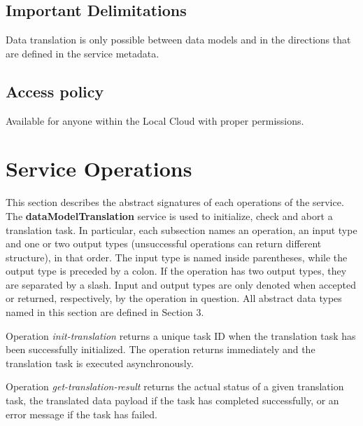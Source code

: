 \documentclass[a4paper]{arrowhead}
\begin{document}
\subsection{Important Delimitations}
\label{sec:delimitations}

Data translation is only possible between data models and in the directions that are defined in the service metadata.

\subsection{Access policy}
\label{sec:accesspolicy}

Available for anyone within the Local Cloud with proper permissions.

\newpage

\section{Service Operations}
\label{sec:functions}

This section describes the abstract signatures of each operations of the service. The \textbf{dataModelTranslation} service is used to initialize, check and abort a translation task.
In particular, each subsection names an operation, an input type and one or two output types (unsuccessful operations can return different structure), in that order.
The input type is named inside parentheses, while the output type is preceded by a colon. If the operation has two output types, they are separated by a slash.
Input and output types are only denoted when accepted or returned, respectively, by the operation in question. All abstract data types named in this section are defined in Section 3.

{}

Operation \textit{init-translation} returns a unique task ID when the translation task has been successfully initialized. The operation returns immediately and the translation task is executed asynchronously.


Operation \textit{get-translation-result} returns the actual status of a given translation task, the translated data payload if the task has completed successfully, or an error message if the task has failed.
\end{document}
